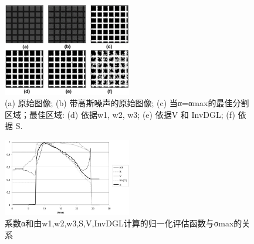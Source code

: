 \begin{figure}[htbp]
    \centering
    \includegraphics[width=0.5\textwidth]{figures/人工图像测试.png}
    \caption{(a) 原始图像; (b) 带高斯噪声的原始图像; (c) 当α=αmax的最佳分割区域；最佳区域: (d) 依据w1, w2, w3; (e) 依据V 和 InvDGL; (f) 依据 S.}
    \label{fig:人工图像测试}
\end{figure}

\begin{figure}[htbp]
    \centering
    \includegraphics[width=0.5\textwidth]{figures/评估函数.png}
    \caption{系数α和由w1,w2,w3,S,V,InvDGL计算的归一化评估函数与σmax的关系}
    \label{fig:评估函数}
\end{figure}

